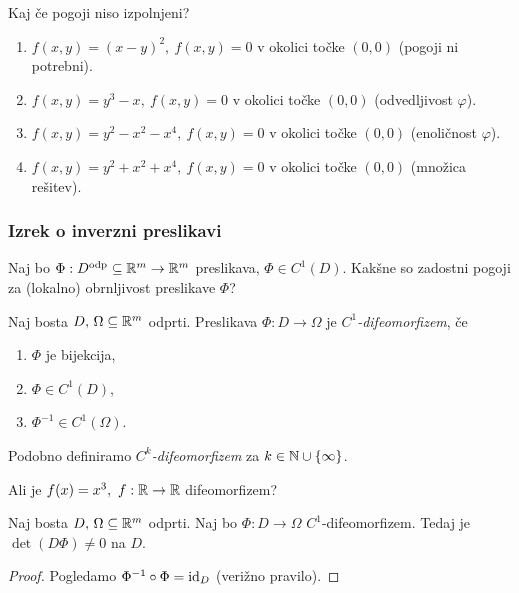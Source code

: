 \begin{zgled}
    Kaj če pogoji niso izpolnjeni?
    \begin{enumerate}
        \item $f(x,y) = (x-y)^2, \ f(x,y) = 0$ v okolici točke $(0,0)$ (pogoji ni potrebni).
        \item $f(x,y) = y^3 - x, \ f(x,y) = 0$ v okolici točke $(0,0)$ (odvedljivost $\varphi$).
        \item $f(x,y) = y^2-x^2-x^4, \ f(x,y) = 0$ v okolici točke $(0,0)$ (enoličnost $\varphi$).
        \item $f(x,y) = y^2+x^2+x^4, \ f(x,y) = 0$ v okolici točke $(0,0)$ (množica rešitev).
    \end{enumerate}
\end{zgled}

\subsubsection{Izrek o inverzni preslikavi}
Naj bo $\Phi: D^\text{odp} \subseteq \mathbb{R}^m \to \mathbb{R}^m$ preslikava, $\Phi \in C^1(D)$. Kakšne so zadostni pogoji za (lokalno) obrnljivost preslikave $\Phi$?
\begin{definicija}
    Naj bosta $D, \, \Omega \subseteq \mathbb{R}^m$ odprti. Preslikava $\Phi: D  \to \Omega$ je \emph{$C^1$-difeomorfizem}, če
    \begin{enumerate}
        \item $\Phi$ je bijekcija, 
        \item $\Phi \in C^1(D)$,
        \item $\Phi^{-1} \in C^1(\Omega)$.
    \end{enumerate} 
    Podobno definiramo \emph{$C^k$-difeomorfizem} za $k \in \mathbb{N} \cup \left\{\infty\right\}$.
\end{definicija}

\begin{zgled}
    Ali je $f(x) = x^3, \ f: \mathbb{R} \to \mathbb{R}$ difeomorfizem?
\end{zgled}

\begin{trditev}
    Naj bosta $D, \, \Omega \subseteq \mathbb{R}^m$ odprti. Naj bo $\Phi: D  \to \Omega$ $C^1$-difeomorfizem. Tedaj je $\det(D\Phi) \neq 0$ na $D$. 
\end{trditev}

\begin{proof}
    Pogledamo $\Phi^{-1} \circ \Phi = \operatorname{id}_D$ (verižno pravilo).
\end{proof}

